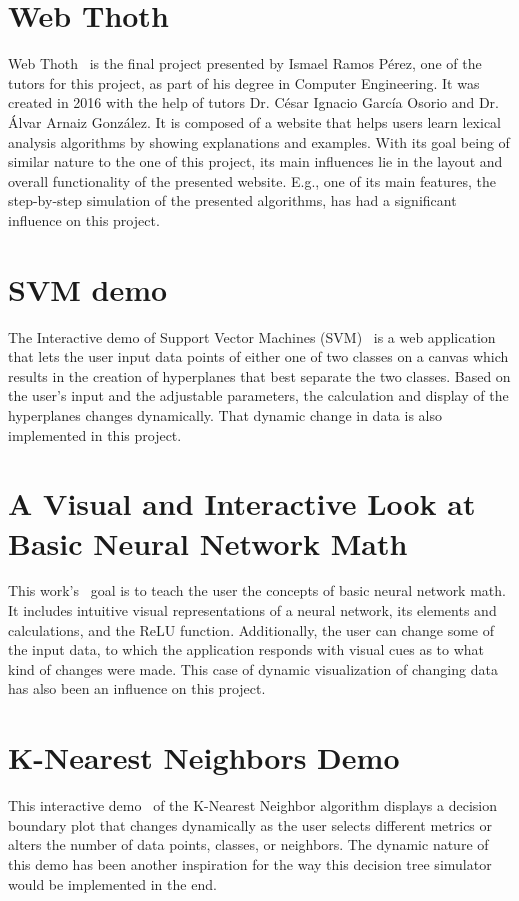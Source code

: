 
\section{Web Thoth}
Web Thoth~\cite{web_thoth} is the final project presented by Ismael Ramos Pérez, one of the tutors for this project, as part of his degree in Computer Engineering. It was created in 2016 with the help of tutors Dr. César Ignacio García Osorio and Dr. Álvar Arnaiz González. It is composed of a website that helps users learn lexical analysis algorithms by showing explanations and examples. With its goal being of similar nature to the one of this project, its main influences lie in the layout and overall functionality of the presented website. E.g., one of its main features, the step-by-step simulation of the presented algorithms, has had a significant influence on this project.

\section{SVM demo}
The Interactive demo of Support Vector Machines (SVM)~\cite{svm_demo} is a web application that lets the user input data points of either one of two classes on a canvas which results in the creation of hyperplanes that best separate the two classes. Based on the user's input and the adjustable parameters, the calculation and display of the hyperplanes changes dynamically. That dynamic change in data is also implemented in this project.

\section{A Visual and Interactive Look at Basic Neural Network Math}
This work's~\cite{neural_network_math_demo} goal is to teach the user the concepts of basic neural network math. It includes intuitive visual representations of a neural network, its elements and calculations, and the ReLU function. Additionally, the user can change some of the input data, to which the application responds with visual cues as to what kind of changes were made. This case of dynamic visualization of changing data has also been an influence on this project.

\section{K-Nearest Neighbors Demo}
This interactive demo~\cite{knn_demo} of the K-Nearest Neighbor algorithm displays a decision boundary plot that changes dynamically as the user selects different metrics or alters the number of data points, classes, or neighbors. The dynamic nature of this demo has been another inspiration for the way this decision tree simulator would be implemented in the end.